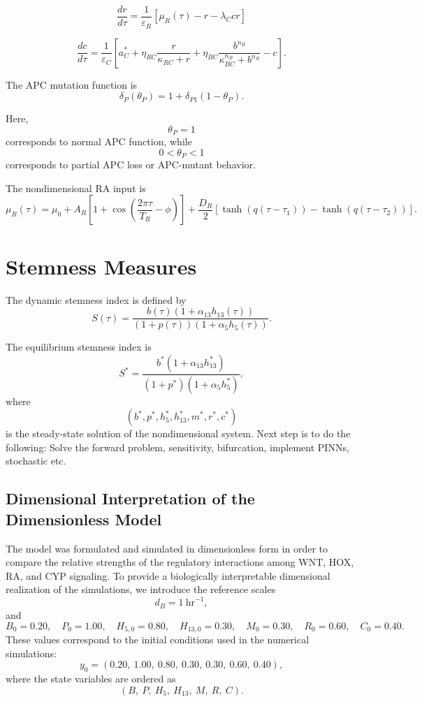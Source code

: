 \documentclass[11pt]{article}
\begin{document}
\[
\boxed{
\frac{dr}{d\tau}
=
\frac{1}{\varepsilon_R}
\left[
\mu_R(\tau)
-
r
-
\lambda_Ccr
\right]
}
\]

\[
\boxed{
\frac{dc}{d\tau}
=
\frac{1}{\varepsilon_C}
\left[
a_C^*
+
\eta_{RC}\frac{r}{\kappa_{RC}+r}
+
\eta_{BC}
\frac{b^{n_B}}
{\kappa_{BC}^{n_B}+b^{n_B}}
-
c
\right].
}
\]

The APC mutation function is
\[
\boxed{
\delta_P(\theta_P)=1+\delta_{P1}(1-\theta_P).
}
\]

Here,
\[
\theta_P=1
\]
corresponds to normal APC function, while
\[
0<\theta_P<1
\]
corresponds to partial APC loss or APC-mutant behavior.

The nondimensional RA input is
\[
\boxed{
\mu_R(\tau)
=
\mu_0
+
A_R
\left[
1+
\cos\left(
\frac{2\pi \tau}{T_R}-\phi
\right)
\right]
+
\frac{D_R}{2}
\left[
\tanh(q(\tau-\tau_1))
-
\tanh(q(\tau-\tau_2))
\right].
}
\]

\section{Stemness Measures}

The dynamic stemness index is defined by
\[
\boxed{
S(\tau)
=
\frac{
b(\tau)\left(1+\alpha_{13}h_{13}(\tau)\right)
}
{
\left(1+p(\tau)\right)
\left(1+\alpha_5h_5(\tau)\right)
}.
}
\]

The equilibrium stemness index is
\[
\boxed{
S^*
=
\frac{
b^*\left(1+\alpha_{13}h_{13}^*\right)
}
{
\left(1+p^*\right)
\left(1+\alpha_5h_5^*\right)
},
}
\]
where
\[
(b^*,p^*,h_5^*,h_{13}^*,m^*,r^*,c^*)
\]
is the steady-state solution of the nondimensional system.
 Next step is to do the following:
  Solve the forward problem, sensitivity, bifurcation, implement PINNs, stochastic etc.


\newpage

\subsection{Dimensional Interpretation of the Dimensionless Model}

The model was formulated and simulated in dimensionless form in order to compare
the relative strengths of the regulatory interactions among WNT, HOX, RA, and
CYP signaling. To provide a biologically interpretable dimensional realization of
the simulations, we introduce the reference scales
\[
d_B=1\ \mathrm{hr}^{-1},
\]
and
\[
B_0=0.20,\quad
P_0=1.00,\quad
H_{5,0}=0.80,\quad
H_{13,0}=0.30,\quad
M_0=0.30,\quad
R_0=0.60,\quad
C_0=0.40.
\]
These values correspond to the initial conditions used in the numerical simulations:
\[
y_0=(0.20,\ 1.00,\ 0.80,\ 0.30,\ 0.30,\ 0.60,\ 0.40),
\]
where the state variables are ordered as
\[
(B,\ P,\ H_5,\ H_{13},\ M,\ R,\ C).
\]
\end{document}
